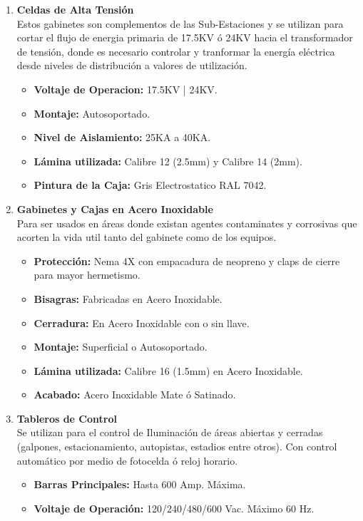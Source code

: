 \documentclass[11pt,letterpaper]{article}
\begin{document}
\begin{enumerate}
	\item \textbf{Celdas de Alta Tensión}\\
		Estos gabinetes son complementos de las Sub-Estaciones y se utilizan para cortar el flujo de energia primaria de 17.5KV ó 24KV hacia el transformador de tensión, donde es necesario controlar y tranformar la energía eléctrica desde niveles de distribución a valores de utilización.
		\begin{itemize}
			\item \textbf{Voltaje de Operacion:} 17.5KV | 24KV.
			\item \textbf{Montaje:} Autosoportado.
			\item \textbf{Nivel de Aislamiento:} 25KA a 40KA.
			\item \textbf{Lámina utilizada:} Calibre 12 (2.5mm) y Calibre 14 (2mm).
			\item \textbf{Pintura de la Caja:} Gris Electrostatico RAL 7042.
		\end{itemize}
	\item \textbf{Gabinetes y Cajas en Acero Inoxidable}\\
		Para ser usados en áreas donde existan agentes contaminates y corrosivas que acorten la vida util tanto del gabinete como de los equipos.
		\begin{itemize}
			\item \textbf{Protección:} Nema 4X con empacadura de neopreno y claps de cierre para mayor hermetismo.
			\item \textbf{Bisagras:} Fabricadas en Acero Inoxidable.
			\item \textbf{Cerradura:} En Acero Inoxidable con o sin llave.
			\item \textbf{Montaje:} Superficial o Autosoportado.
			\item \textbf{Lámina utilizada:} Calibre 16 (1.5mm) en Acero Inoxidable.
			\item \textbf{Acabado:} Acero Inoxidable Mate ó Satinado.
		\end{itemize}
	\item \textbf{Tableros de Control}\\
		Se utilizan para el control de Iluminación de áreas abiertas y cerradas (galpones, estacionamiento, autopistas, estadios entre otros). Con control automático por medio de fotocelda ó reloj horario.
		\begin{itemize}
			\item \textbf{Barras Principales:} Hasta 600 Amp. Máxima.
			\item \textbf{Voltaje de Operación:} 120/240/480/600 Vac. Máximo 60 Hz.

\end{itemize}
\end{enumerate}
\end{document}
